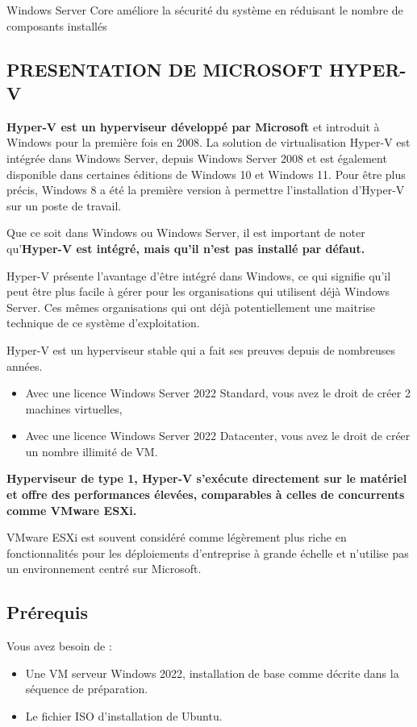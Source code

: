 \noindent Windows Server Core améliore la sécurité du système en réduisant le nombre de composants installés

\subsection*{PRESENTATION DE MICROSOFT HYPER-V}
{}
\noindent \textbf{Hyper-V est un hyperviseur développé par Microsoft} et introduit à Windows pour la première fois en 2008. La solution de virtualisation Hyper-V est intégrée dans Windows Server, depuis Windows Server 2008 et est également disponible dans certaines éditions de Windows 10 et Windows 11. Pour être plus précis, Windows 8 a été la première version à permettre l'installation d'Hyper-V sur un poste de travail.

\noindent Que ce soit dans Windows ou Windows Server, il est important de noter qu'\textbf{Hyper-V est intégré, mais qu'il n'est pas installé par défaut.}

\newpage

\noindent Hyper-V présente l'avantage d'être intégré dans Windows, ce qui signifie qu'il peut être plus facile à gérer pour les organisations qui utilisent déjà Windows Server. Ces mêmes organisations qui ont déjà potentiellement une maitrise technique de ce système d'exploitation.

\noindent Hyper-V est un hyperviseur stable qui a fait ses preuves depuis de nombreuses années.
\begin{itemize}
  \item Avec une licence Windows Server 2022 Standard, vous avez le droit de créer 2 machines virtuelles,
  \item Avec une licence Windows Server 2022 Datacenter, vous avez le droit de créer un nombre illimité de VM.
\end{itemize}

\noindent \textbf{Hyperviseur de type 1, Hyper-V s'exécute directement sur le matériel et offre des performances
élevées, comparables à celles de concurrents comme VMware ESXi.}

\noindent VMware ESXi est souvent considéré comme légèrement plus riche en fonctionnalités pour les déploiements d'entreprise à grande échelle et n'utilise pas un environnement centré sur Microsoft.

\subsection*{Prérequis}
{}
\noindent Vous avez besoin de :
\begin{itemize}
  \item Une VM serveur Windows 2022, installation de base comme décrite dans la séquence de préparation.
  \item Le fichier ISO d'installation de Ubuntu.
\end{itemize}

